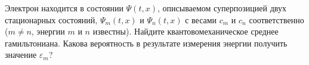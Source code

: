 \documentclass[__main__.tex]{subfiles}
\begin{document}
Электрон находится в состоянии $\Psi(t,x)$, описываемом суперпозицией двух стационарных состояний, $\Psi_m(t,x)$ и $\Psi_n(t,x)$ с весами $c_m$ и $c_n$ соответственно ($m\neq n$, энергии $m$ и $n$ известны). Найдите квантовомеханическое среднее гамильтониана. Какова вероятность в результате измерения энергии получить значение $\varepsilon_m$?\\ 

\end{document}
